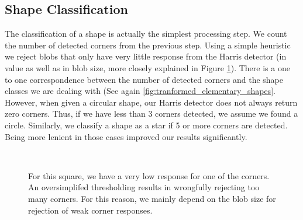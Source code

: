 \documentclass[conference]{IEEEtran}
\begin{document}
\subsection{Shape Classification}
The classification of a shape is actually the simplest processing step. 
We count the number of detected corners from the previous step. 
Using a simple heuristic we reject blobs that only have very little response from the Harris 
detector (in value as well as in blob size, more closely explained in Figure \ref{fig:blob_rejection}).
There is a one to one correspondence between the number of detected corners and the shape classes
we are dealing with (See again \ref{fig:tranformed_elementary_shapes}.
However, when given a circular shape, our Harris detector does not always return zero corners. 
Thus, if we have less than 3 corners detected, we assume we found a circle. 
Similarly, we classify a shape as a star if 5 or more corners are detected. 
Being more lenient in those cases improved our results significantly.

\begin{figure}%
\centering
{}
 \\
\caption{For this square, we have a very low response for one of the corners. 
An oversimplifed thresholding results in wrongfully rejecting too many corners. 
For this reason, we mainly depend on the blob size for
rejection of weak corner responses.}
\label{fig:blob_rejection}
\end{figure}
\end{document}
